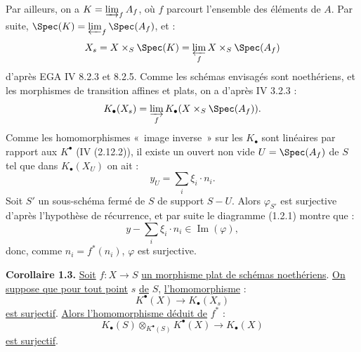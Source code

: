 
Par
ailleurs, on a $K=\varinjlim_f A_f$, où $f$ parcourt l'ensemble des éléments de $A$. Par suite, $\Spec(K)=\varprojlim_f\Spec(A_f)$, et :
\[
X_s=X\times_S\Spec(K)=\varprojlim_f X\times_S\Spec(A_f)
\]
d'après EGA IV 8.2.3 et 8.2.5. Comme les schémas envisagés sont noethériens, et les morphismes de transition affines et plats, on a d'après IV 3.2.3 :
\[
K_\bullet(X_s)=\varinjlim_f K_\bullet(X\times_S\Spec(A_f)).
\]
Comme les homomorphismes «~image inverse~» sur les $K_\bullet$ sont linéaires par rapport aux $K^{\bullet}$ (IV (2.12.2)), il existe un ouvert non vide $U=\Spec(A_f)$ de $S$ tel que dans $K_\bullet(X_U)$ on ait :
\[
y_U=\sum_i\xi_i\cdot n_i.
\]
Soit $S'$ un sous-schéma fermé de $S$ de support $S-U$. Alors $\varphi_{S'}$ est surjective d'après l'hypothèse de récurrence, et par suite le diagramme (1.2.1) montre que :
\[
y-\sum_i\xi_i\cdot n_i\in \operatorname{Im}(\varphi),
\]
donc, comme $n_i=f^*(n_i)$, $\varphi$ est surjective.

\textbf{Corollaire 1.3.} \uline{Soit} $f:X\to S$ \uline{un morphisme plat de schémas noethériens}. \uline{On suppose que pour tout point} $s$ \uline{de} $S$, \uline{l'homomorphisme} :
\[
K^{\bullet}(X)\longrightarrow K_\bullet(X_s)
\]
\uline{est surjectif}. \uline{Alors l'homomorphisme déduit de} $f^*$ :
\[
K_\bullet(S)\otimes_{K^{\bullet}(S)}K^{\bullet}(X)\longrightarrow K_\bullet(X)
\]
\uline{est surjectif}.

